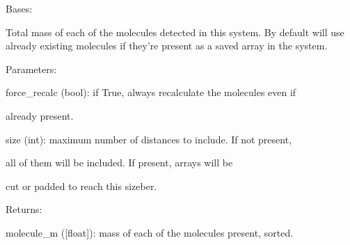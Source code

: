 \documentclass[letterpaper,10pt,english]{sphinxmanual}
\begin{document}

\begin{fulllineitems}
\label{doctree/soprano.properties.linkage.linkage:soprano.properties.linkage.linkage.MoleculeMass}
Bases: {\hyperref[doctree/soprano.properties.atomsproperty:soprano.properties.atomsproperty.AtomsProperty]{\emph{}}}

Total mass of each of the molecules detected in this system. By default
will use already existing molecules if they're present as a saved array in
the system.

\begin{DUlineblock}{0em}
\item[] Parameters:
\item[]
\begin{DUlineblock}{\DUlineblockindent}
\item[] force\_recalc (bool): if True, always recalculate the molecules even if
\item[]
\begin{DUlineblock}{\DUlineblockindent}
\item[] already present.
\end{DUlineblock}
\item[] size (int): maximum number of distances to include. If not present,
\item[]
\begin{DUlineblock}{\DUlineblockindent}
\item[] all of them will be included. If present, arrays will be
\item[] cut or padded to reach this sizeber.
\end{DUlineblock}
\end{DUlineblock}
\end{DUlineblock}

\begin{DUlineblock}{0em}
\item[] Returns:
\item[]
\begin{DUlineblock}{\DUlineblockindent}
\item[] molecule\_m ({[}float{]}): mass of each of the molecules present, sorted.
\end{DUlineblock}
\end{DUlineblock}


\end{fulllineitems}
\end{document}
